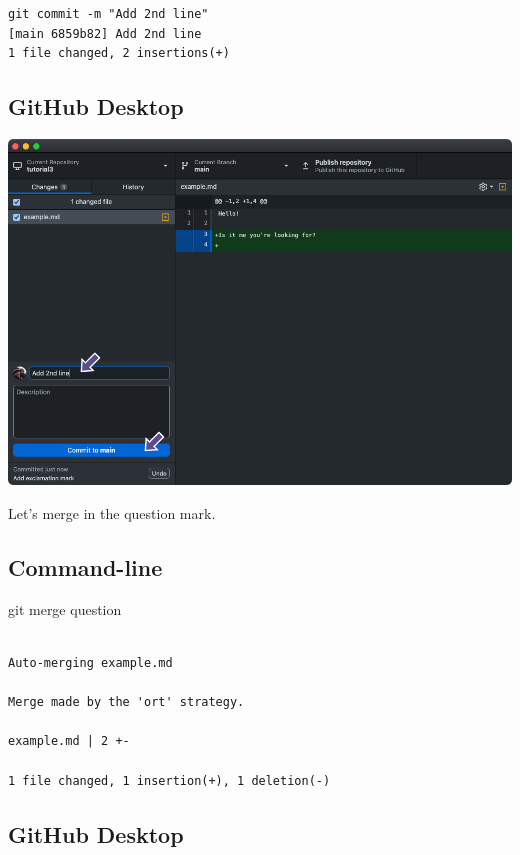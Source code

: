 \documentclass[
  letterpaper,
  DIV=11,
  numbers=noendperiod]{scrartcl}
\newenvironment{Shaded}{\begin{snugshade}}{\end{snugshade}}
\newcommand{\NormalTok}[1]{\textcolor[rgb]{0.00,0.23,0.31}{#1}}
\begin{document}
\begin{verbatim}
git commit -m "Add 2nd line"
[main 6859b82] Add 2nd line
1 file changed, 2 insertions(+)
\end{verbatim}

\subsection{GitHub Desktop}

\includegraphics{images/image42.png}

Let's merge in the question mark.

\subsection{Command-line}

\begin{Shaded}
\begin{Highlighting}[]
\NormalTok{git merge question}
\end{Highlighting}
\end{Shaded}

\begin{verbatim}

Auto-merging example.md

Merge made by the 'ort' strategy.

example.md | 2 +-

1 file changed, 1 insertion(+), 1 deletion(-)
\end{verbatim}

\subsection{GitHub Desktop}
\end{document}
